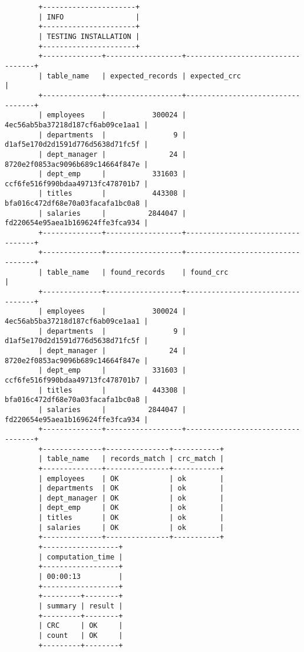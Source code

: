 \documentclass[12pt, letterpaper, twoside]{article}
\begin{document}
	\begin{verbatim}
		+----------------------+
		| INFO                 |
		+----------------------+
		| TESTING INSTALLATION |
		+----------------------+
		+--------------+------------------+----------------------------------+
		| table_name   | expected_records | expected_crc                     |
		+--------------+------------------+----------------------------------+
		| employees    |           300024 | 4ec56ab5ba37218d187cf6ab09ce1aa1 |
		| departments  |                9 | d1af5e170d2d1591d776d5638d71fc5f |
		| dept_manager |               24 | 8720e2f0853ac9096b689c14664f847e |
		| dept_emp     |           331603 | ccf6fe516f990bdaa49713fc478701b7 |
		| titles       |           443308 | bfa016c472df68e70a03facafa1bc0a8 |
		| salaries     |          2844047 | fd220654e95aea1b169624ffe3fca934 |
		+--------------+------------------+----------------------------------+
		+--------------+------------------+----------------------------------+
		| table_name   | found_records    | found_crc                        |
		+--------------+------------------+----------------------------------+
		| employees    |           300024 | 4ec56ab5ba37218d187cf6ab09ce1aa1 |
		| departments  |                9 | d1af5e170d2d1591d776d5638d71fc5f |
		| dept_manager |               24 | 8720e2f0853ac9096b689c14664f847e |
		| dept_emp     |           331603 | ccf6fe516f990bdaa49713fc478701b7 |
		| titles       |           443308 | bfa016c472df68e70a03facafa1bc0a8 |
		| salaries     |          2844047 | fd220654e95aea1b169624ffe3fca934 |
		+--------------+------------------+----------------------------------+
		+--------------+---------------+-----------+
		| table_name   | records_match | crc_match |
		+--------------+---------------+-----------+
		| employees    | OK            | ok        |
		| departments  | OK            | ok        |
		| dept_manager | OK            | ok        |
		| dept_emp     | OK            | ok        |
		| titles       | OK            | ok        |
		| salaries     | OK            | ok        |
		+--------------+---------------+-----------+
		+------------------+
		| computation_time |
		+------------------+
		| 00:00:13         |
		+------------------+
		+---------+--------+
		| summary | result |
		+---------+--------+
		| CRC     | OK     |
		| count   | OK     |
		+---------+--------+
	\end{verbatim}
	
\end{document}
